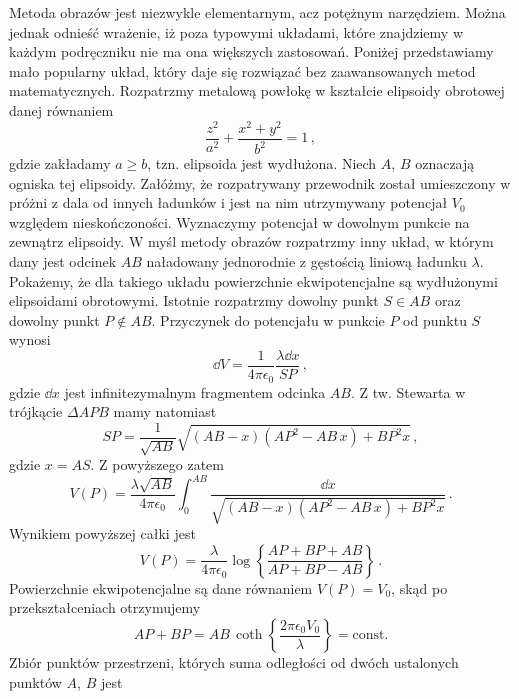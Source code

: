 \documentclass[../main.tex]{subfiles}
\begin{document}
\begin{enumerate}
\medskip
Metoda obrazów jest niezwykle elementarnym, acz potężnym narzędziem. Można jednak odnieść wrażenie,
iż poza typowymi układami, które znajdziemy w każdym podręczniku nie ma ona większych zastosowań.
Poniżej przedstawiamy mało popularny układ, który daje się rozwiązać bez zaawansowanych metod
matematycznych. Rozpatrzmy metalową powłokę w kształcie elipsoidy obrotowej danej równaniem
\begin{equation*}\label{eq:spheroid}
    \frac{z^2}{a^2}+\frac{x^2+y^2}{b^2}=1\,,
\end{equation*}
gdzie zakładamy \(a\geq b\), tzn. elipsoida jest wydłużona. Niech \(A\), \(B\) oznaczają ogniska tej
elipsoidy. Załóżmy, że rozpatrywany przewodnik został umieszczony w próżni z dala od innych ładunków
i jest na nim utrzymywany potencjał \(V_0\) względem nieskończoności. Wyznaczymy potencjał w
dowolnym punkcie na zewnątrz elipsoidy. W myśl metody obrazów rozpatrzmy inny układ, w którym dany
jest odcinek \(AB\) naładowany jednorodnie z gęstością liniową ładunku \(\lambda\). Pokażemy, że dla
takiego układu powierzchnie ekwipotencjalne są wydłużonymi elipsoidami obrotowymi. Istotnie
rozpatrzmy dowolny punkt \(S\in AB\) oraz dowolny punkt \(P\notin AB\). Przyczynek do potencjału w
punkcie \(P\) od punktu \(S\) wynosi
\begin{equation*}
    \dd V=\frac{1}{4\pi\epsilon_0}\frac{\lambda \dd{x}}{SP}\,,
\end{equation*}
gdzie \(\dd{x}\) jest infinitezymalnym fragmentem odcinka \(AB\). Z tw. Stewarta w trójkącie
\(\Delta APB\) mamy natomiast
\begin{equation*}
    SP=\frac{1}{\sqrt{AB}}\sqrt{(AB-x)(AP^2-AB\,x)+BP^2x}\,,
\end{equation*}
gdzie \(x=AS\). Z powyższego zatem
\begin{equation*}
    V(P)=\frac{\lambda \sqrt{AB}}{4\pi\epsilon_0}\int_0^{AB}\frac{\dd{x}}{\sqrt{(AB-x)(AP^2-AB\,x)+BP^2x}}\,.
\end{equation*}
Wynikiem powyższej całki jest
\begin{equation*}
    V(P)=\frac{\lambda}{4\pi\epsilon_0}\log\left\{\frac{AP+BP+AB}{AP+BP-AB}\right\}\,.
\end{equation*}
Powierzchnie ekwipotencjalne są dane równaniem \(V(P)=V_0\), skąd po przekształceniach otrzymujemy
\begin{equation*}
    AP+BP=AB\,\coth\left\{\frac{2\pi\epsilon_0V_0}{\lambda}\right\}=\text{const.}
\end{equation*}
Zbiór punktów przestrzeni, których suma odległości od dwóch ustalonych punktów \(A\), \(B\) jest

\end{enumerate}
\end{document}
